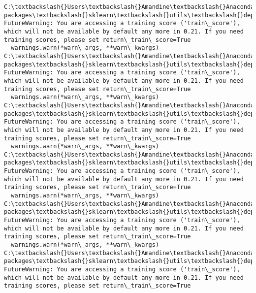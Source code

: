 \documentclass[11pt]{article}
\begin{document}
    \begin{Verbatim}[commandchars=\\\{\}]
C:\textbackslash{}Users\textbackslash{}Amandine\textbackslash{}Anaconda3\textbackslash{}lib\textbackslash{}site-packages\textbackslash{}sklearn\textbackslash{}utils\textbackslash{}deprecation.py:122: FutureWarning: You are accessing a training score ('train\_score'), which will not be available by default any more in 0.21. If you need training scores, please set return\_train\_score=True
  warnings.warn(*warn\_args, **warn\_kwargs)
C:\textbackslash{}Users\textbackslash{}Amandine\textbackslash{}Anaconda3\textbackslash{}lib\textbackslash{}site-packages\textbackslash{}sklearn\textbackslash{}utils\textbackslash{}deprecation.py:122: FutureWarning: You are accessing a training score ('train\_score'), which will not be available by default any more in 0.21. If you need training scores, please set return\_train\_score=True
  warnings.warn(*warn\_args, **warn\_kwargs)
C:\textbackslash{}Users\textbackslash{}Amandine\textbackslash{}Anaconda3\textbackslash{}lib\textbackslash{}site-packages\textbackslash{}sklearn\textbackslash{}utils\textbackslash{}deprecation.py:122: FutureWarning: You are accessing a training score ('train\_score'), which will not be available by default any more in 0.21. If you need training scores, please set return\_train\_score=True
  warnings.warn(*warn\_args, **warn\_kwargs)
C:\textbackslash{}Users\textbackslash{}Amandine\textbackslash{}Anaconda3\textbackslash{}lib\textbackslash{}site-packages\textbackslash{}sklearn\textbackslash{}utils\textbackslash{}deprecation.py:122: FutureWarning: You are accessing a training score ('train\_score'), which will not be available by default any more in 0.21. If you need training scores, please set return\_train\_score=True
  warnings.warn(*warn\_args, **warn\_kwargs)
C:\textbackslash{}Users\textbackslash{}Amandine\textbackslash{}Anaconda3\textbackslash{}lib\textbackslash{}site-packages\textbackslash{}sklearn\textbackslash{}utils\textbackslash{}deprecation.py:122: FutureWarning: You are accessing a training score ('train\_score'), which will not be available by default any more in 0.21. If you need training scores, please set return\_train\_score=True
  warnings.warn(*warn\_args, **warn\_kwargs)
C:\textbackslash{}Users\textbackslash{}Amandine\textbackslash{}Anaconda3\textbackslash{}lib\textbackslash{}site-packages\textbackslash{}sklearn\textbackslash{}utils\textbackslash{}deprecation.py:122: FutureWarning: You are accessing a training score ('train\_score'), which will not be available by default any more in 0.21. If you need training scores, please set return\_train\_score=True

\end{Verbatim}
\end{document}
